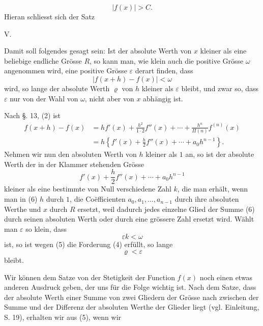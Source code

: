 
\begin{equation}
 |f(x)|>C.
\tag{3}
\end{equation}
Hieran schliesst sich der Satz

\medskip
\noindent V. 
\medskip

Damit soll folgendes gesagt sein: Ist der absolute Werth von $x$ kleiner als eine beliebige endliche Grösse $R$, so kann man, wie klein auch die positive Grösse $\omega$ angenommen wird, eine positive Grösse $\varepsilon$ derart finden, dass
\begin{equation}
 |f(x+h)-f(x)|<\omega
\tag{4}
\end{equation}
wird, so lange der absolute Werth $\varrho$ von $h$ kleiner als $\varepsilon$ bleibt, und zwar so, dass $\varepsilon$ nur von der Wahl von $\omega$, nicht aber von $x$ abhängig ist.

Nach §. 13, (2) ist
\begin{equation}
\begin{split}
 f(x+h)-f(x)&=h f'(x)+\frac{h^2}{1\cdot2}f''(x)+\cdots+\frac{h^n}{\Pi(n)}f^{(n)}(x)\\
 &=h\left\{f'(x)+\frac{h}{2}f''(x)+\cdots+a_0 h^{n-1}\right\}.
\end{split}
\tag{5}
\end{equation}
Nehmen wir nun den absoluten Werth von $h$ kleiner als $1$ an, so ist der absolute Werth der in der Klammer stehenden Grösse
\begin{equation}
 f'(x)+\frac{h}{2}f''(x)+\cdots+a_0 h^{n-1}
\tag{6}
\end{equation}
kleiner als eine bestimmte von Null verschiedene Zahl $k$, die man erhält, wenn man in (6) $h$ durch $1$, die Coëfficienten $a_0,a_1,\ldots,a_{n-1}$ durch ihre absoluten Werthe und $x$ durch $R$ ersetzt, weil dadurch jedes einzelne Glied der Summe (6) durch seinen absoluten Werth oder durch eine grössere Zahl ersetzt wird. Wählt man $\varepsilon$ so klein, dass
\[
 \varepsilon k<\omega
\]
ist, so ist wegen (5) die Forderung (4) erfüllt, so lange
\[
 \varrho<\varepsilon
\]
bleibt.

Wir können dem Satze von der Stetigkeit der Function $f(x)$ noch einen etwas anderen Ausdruck geben, der uns für die Folge wichtig ist. Nach dem Satze, dass der absolute Werth einer Summe von zwei Gliedern der Grösse nach zwischen der Summe und der Differenz der absoluten Werthe der Glieder liegt (vgl. Einleitung, S. 19), erhalten wir aus (5), wenn wir
